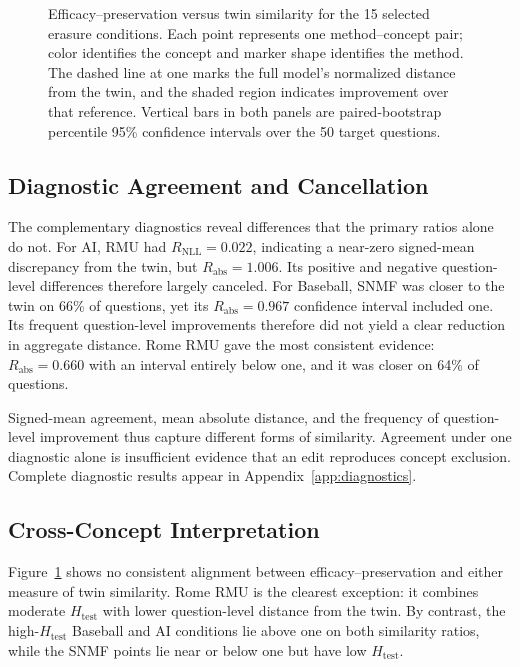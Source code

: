 \begin{figure}[t]
  \caption{Efficacy--preservation versus twin similarity for the 15 selected
  erasure conditions. Each point represents one method--concept pair; color
  identifies the concept and marker shape identifies the method. The dashed
  line at one marks the full model's normalized distance from the twin, and
  the shaded region indicates improvement over that reference. Vertical bars
  in both panels are paired-bootstrap percentile 95\% confidence intervals
  over the 50 target questions.}
  \label{fig:efficacy-similarity}
\end{figure}

\subsection{Diagnostic Agreement and Cancellation}

The complementary diagnostics reveal differences that the primary ratios
alone do not. For AI, RMU had $R_{\mathrm{NLL}}=0.022$, indicating a near-zero
signed-mean discrepancy from the twin, but
$R_{\mathrm{abs}}=1.006$. Its positive and negative question-level
differences therefore largely canceled. For Baseball, SNMF was closer to the
twin on 66\% of questions, yet its $R_{\mathrm{abs}}=0.967$ confidence interval
included one. Its frequent question-level improvements therefore did not yield
a clear reduction in aggregate distance. Rome RMU gave the most consistent
evidence:
$R_{\mathrm{abs}}=0.660$ with an interval entirely below one, and it was closer
on 64\% of questions.

Signed-mean agreement, mean absolute distance, and the frequency of
question-level improvement thus capture different forms of similarity.
Agreement under one diagnostic alone is insufficient evidence that an edit
reproduces concept exclusion. Complete diagnostic results appear in
Appendix~\ref{app:diagnostics}.

\subsection{Cross-Concept Interpretation}

Figure~\ref{fig:efficacy-similarity} shows no consistent alignment between
efficacy--preservation and either measure of twin similarity. Rome RMU is the
clearest exception: it combines moderate $H_{\mathrm{test}}$ with lower
question-level distance from the twin. By contrast, the high-$H_{\mathrm{test}}$
Baseball and AI conditions lie above one on both similarity ratios, while the
SNMF points lie near or below one but have low $H_{\mathrm{test}}$.

